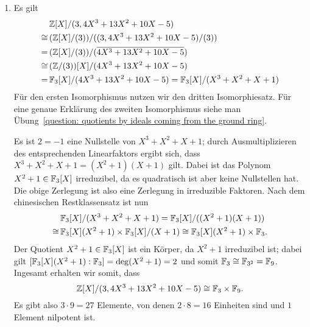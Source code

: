 \begin{solution}
\begin{enumerate}
    \item
      Es gilt
      \begin{align*}
             &\,  \mathbb{Z}[X]/(3, 4 X^3 + 13 X^2 + 10 X - 5)
        \\
        \cong&\,  (\mathbb{Z}[X] / (3)) / ( (3, 4 X^3 + 13 X^2 + 10 X - 5) / (3) )
        \\
            =&\,  (\mathbb{Z}[X] / (3)) / ( \overline{4 X^3 + 13 X^2 + 10 X - 5} )
        \\
        \cong&\,  (\mathbb{Z}/(3))[X] / (4 X^3 + 13 X^2 + 10 X - 5)
        \\
            =&\,  \mathbb{F}_3[X] / (4 X^3 + 13 X^2 + 10 X - 5)
            =     \mathbb{F}_3[X] / (X^3 + X^2 + X + 1)
      \end{align*}
      Für den ersten Isomorphismus nutzen wir den dritten Isomorphiesatz.
      Für eine genaue Erklärung des zweiten Isomorphismus siehe man Übung~\ref{question: quotients by ideals coming from the ground ring}.
      
      Es ist $2 = -1$ eine Nullstelle von $X^3 + X^2 + X + 1$; durch Ausmultiplizieren des entsprechenden Linearfaktors ergibt sich, dass $X^3 + X^2 + X + 1 = (X^2 + 1)(X + 1)$ gilt.
      Dabei ist das Polynom $X^2 + 1 \in \mathbb{F}_3[X]$ irreduzibel, da es quadratisch ist aber keine Nullstellen hat.
      Die obige Zerlegung ist also eine Zerlegung in irreduzible Faktoren.
      Nach dem chinesischen Restklassensatz ist nun
      \begin{align*}
             &\,  \mathbb{F}_3[X]/(X^3 + X^2 + X + 1)
            =     \mathbb{F}_3[X]/( (X^2 + 1)(X + 1) )
        \\
        \cong&\,  \mathbb{F}_3[X](X^2 + 1) \times \mathbb{F}_3[X]/(X+1)
        \cong     \mathbb{F}_3[X](X^2 + 1) \times \mathbb{F}_3.
      \end{align*}
      Der Quotient $X^2 + 1 \in \mathbb{F}_3[X]$ ist ein Körper, da $X^2 + 1$ irreduzibel ist; dabei gilt $[\mathbb{F}_3[X](X^2 + 1) : \mathbb{F}_3] = \deg (X^2 + 1) = 2$ und somit $\mathbb{F}_3 \cong \mathbb{F}_{3^2} = \mathbb{F}_9$.
      Ingesamt erhalten wir somit, dass
      \[
              \mathbb{Z}[X]/(3, 4 X^3 + 13 X^2 + 10 X - 5)
        \cong \mathbb{F}_3 \times \mathbb{F}_9.
      \]
      Es gibt also $3 \cdot 9 = 27$ Elemente, von denen $2 \cdot 8 = 16$ Einheiten sind und $1$ Element nilpotent ist.
    

\end{enumerate}
\end{solution}
